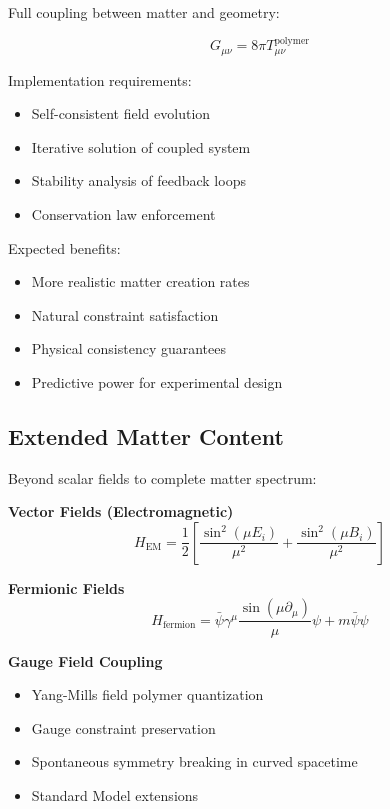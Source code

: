\documentclass[11pt]{article}
\begin{document}
Full coupling between matter and geometry:

\begin{equation}
G_{\mu\nu} = 8\pi T_{\mu\nu}^{\text{polymer}}
\end{equation}

Implementation requirements:
\begin{itemize}
\item Self-consistent field evolution
\item Iterative solution of coupled system
\item Stability analysis of feedback loops
\item Conservation law enforcement
\end{itemize}

Expected benefits:
\begin{itemize}
\item More realistic matter creation rates
\item Natural constraint satisfaction
\item Physical consistency guarantees
\item Predictive power for experimental design
\end{itemize}

\subsection{Extended Matter Content}

Beyond scalar fields to complete matter spectrum:

\textbf{Vector Fields (Electromagnetic)}
\begin{equation}
H_{\text{EM}} = \frac{1}{2}\left[\frac{\sin^2(\mu E_i)}{\mu^2} + \frac{\sin^2(\mu B_i)}{\mu^2}\right]
\end{equation}

\textbf{Fermionic Fields}
\begin{equation}
H_{\text{fermion}} = \bar{\psi}\gamma^\mu \frac{\sin(\mu \partial_\mu)}{\mu}\psi + m\bar{\psi}\psi
\end{equation}

\textbf{Gauge Field Coupling}
\begin{itemize}
\item Yang-Mills field polymer quantization
\item Gauge constraint preservation
\item Spontaneous symmetry breaking in curved spacetime
\item Standard Model extensions
\end{itemize}
\end{document}

